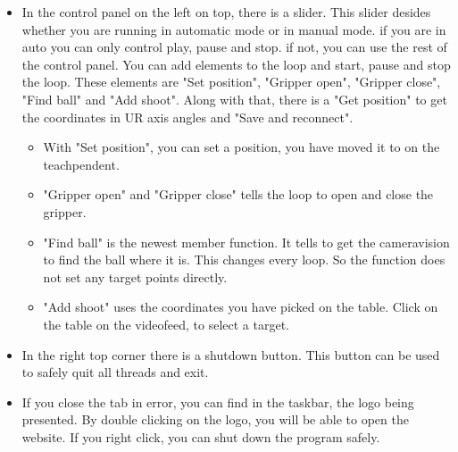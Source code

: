\begin{itemize}
\item In the control panel on the left on top, there is a slider. 
This slider desides whether you are running in automatic mode or in manual mode.
if you are in auto you can only control play, pause and stop.
if not, you can use the rest of the control panel. You can add elements to the loop and start, pause and stop the loop.
These elements are "Set position", "Gripper open", "Gripper close", "Find ball" and "Add shoot".
Along with that, there is a "Get position" to get the coordinates in UR axis angles and "Save and reconnect". 

\begin{itemize}
\item With "Set position", you can set a position, you have moved it to on the teachpendent. 
\item "Gripper open" and "Gripper close" tells the loop to open and close the gripper.
\item "Find ball" is the newest member function. It tells to get the cameravision to find the ball where it is. This changes every loop. So the function does not set any target points directly.
\item "Add shoot" uses the coordinates you have picked on the table. Click on the table on the videofeed, to select a target.
\end{itemize}

\item In the right top corner there is a shutdown button. This button can be used to safely quit all threads and exit.

\item If you close the tab in error, you can find in the taskbar, the logo being presented. By double clicking on the logo, you will be able to open the website.
If you right click, you can shut down the program safely.

\end{itemize}